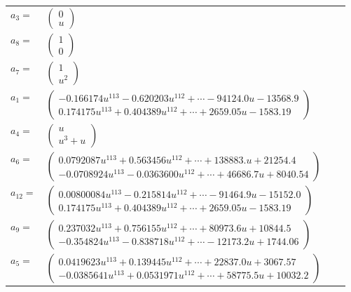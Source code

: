 \documentclass[1p]{elsarticle_modified}
\theoremstyle{definition}
\begin{document}
\begin{tabular}{m{7pt} m{180pt} m{7pt} m{180pt} }
\flushright $a_{3}=$&$\begin{pmatrix}0\\u\end{pmatrix}$ \\
\flushright $a_{8}=$&$\begin{pmatrix}1\\0\end{pmatrix}$ \\
\flushright $a_{7}=$&$\begin{pmatrix}1\\u^2\end{pmatrix}$ \\
\flushright $a_{1}=$&$\begin{pmatrix}-0.166174 u^{113}-0.620203 u^{112}+\cdots-94124.0 u-13568.9\\0.174175 u^{113}+0.404389 u^{112}+\cdots+2659.05 u-1583.19\end{pmatrix}$ \\
\flushright $a_{4}=$&$\begin{pmatrix}u\\u^3+u\end{pmatrix}$ \\
\flushright $a_{6}=$&$\begin{pmatrix}0.0792087 u^{113}+0.563456 u^{112}+\cdots+138883. u+21254.4\\-0.0708924 u^{113}-0.0363600 u^{112}+\cdots+46686.7 u+8040.54\end{pmatrix}$ \\
\flushright $a_{12}=$&$\begin{pmatrix}0.00800084 u^{113}-0.215814 u^{112}+\cdots-91464.9 u-15152.0\\0.174175 u^{113}+0.404389 u^{112}+\cdots+2659.05 u-1583.19\end{pmatrix}$ \\
\flushright $a_{9}=$&$\begin{pmatrix}0.237032 u^{113}+0.756155 u^{112}+\cdots+80973.6 u+10844.5\\-0.354824 u^{113}-0.838718 u^{112}+\cdots-12173.2 u+1744.06\end{pmatrix}$ \\
\flushright $a_{5}=$&$\begin{pmatrix}0.0419623 u^{113}+0.139445 u^{112}+\cdots+22837.0 u+3067.57\\-0.0385641 u^{113}+0.0531971 u^{112}+\cdots+58775.5 u+10032.2\end{pmatrix}$ \\

\end{tabular}
\end{document}
